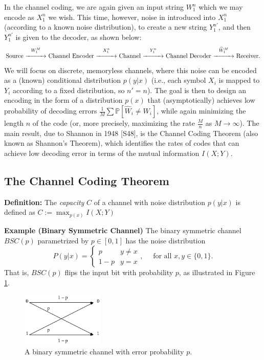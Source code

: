 \documentclass[twoside]{article}
\renewcommand{\cite}[1]{[#1]}
\newcommand\pr{\mathbb{P}}      %
\renewcommand\hat{\widehat}
\begin{document}
In the channel coding, we are again given an input string $W_1^n$ which we may
encode as $X_1^n$ we wish. This time, however, noise in introduced into $X_1^n$
(according to a known noise distribution), to create a new string $Y_1^{n'}$,
and then $Y_1^{n'}$ is given to the decoder, as shown below:
\[\mbox{Source $\stackrel{W_1^M}{\xrightarrow{\hspace*{1cm}}}$ Channel Encoder
$\stackrel{X_1^n}{\xrightarrow{\hspace*{1cm}}}$ Channel
$\stackrel{Y_1^n}{\xrightarrow{\hspace*{1cm}}}$ Channel Decoder
$\stackrel{\hat W_1^M}{\xrightarrow{\hspace*{1cm}}}$ Receiver}.\]
We will focus on discrete, memoryless channels, where this noise can be encoded
as a (known) conditional distribution $p(y|x)$ (i.e., each symbol $X_i$ is
mapped to $Y_i$ according to a fixed distribution, so $n' = n$). The goal is
then to design an encoding in the form of a distribution $p(x)$ that
(asymptotically) achieves low probability of decoding errors
$\frac{1}{M} \sum \pr\left[ \hat W_i \neq W_i \right]$, while again minimizing
the length $n$ of the code (or, more precisely, maximizing the rate
$\frac{M}{n}$ as $M \to \infty$). The main result, due to Shannon in 1948
\cite{S48}, is
the Channel Coding Theorem (also known as Shannon's Theorem), which identifies
the rates of codes that can achieve low decoding error in terms of the mutual
information $I(X;Y)$.

\subsection{The Channel Coding Theorem}
{\bf Definition:} The \emph{capacity} $C$ of a channel with noise distribution
$p(y|x)$ is defined as $C := \max_{p(x)} I(X;Y)$

{\bf Example (Binary Symmetric Channel)} The binary symmetric channel $BSC(p)$
parametrized by $p \in [0,1]$ has the noise distribution
\[P(y | x)
    = \left\{
            \begin{array}{ll}
                p & y \neq x    \\
                1 - p & y = x
            \end{array}
        \right.,
\quad \mbox{ for all } x,y \in \{0,1\}.\]
That is, $BSC(p)$ flips the input bit with probability $p$, as illustrated in
Figure \ref{fig:BSC}.
\begin{figure}[h!]
\centering
\includegraphics[width=0.35\textwidth]{BSC}
\caption{A binary symmetric channel with error probability $p$.}
\label{fig:BSC}
\end{figure}
\end{document}
